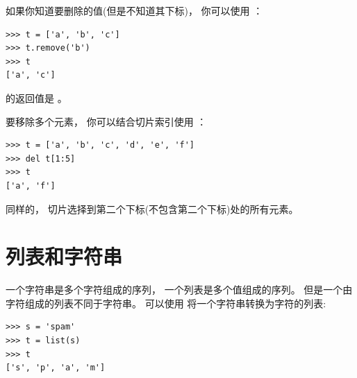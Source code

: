 %

如果你知道要删除的值(但是不知道其下标)， 你可以使用  ：

  

\begin{lstlisting}
>>> t = ['a', 'b', 'c']
>>> t.remove('b')
>>> t
['a', 'c']
\end{lstlisting}
%

 的返回值是 。

  


要移除多个元素， 你可以结合切片索引使用  ：

\begin{lstlisting}
>>> t = ['a', 'b', 'c', 'd', 'e', 'f']
>>> del t[1:5]
>>> t
['a', 'f']
\end{lstlisting}

%

同样的， 切片选择到第二个下标(不包含第二个下标)处的所有元素。


\section{列表和字符串}
  


一个字符串是多个字符组成的序列， 一个列表是多个值组成的序列。  但是一个由字符组成的列表不同于字符串。  可以使用  将一个字符串转换为字符的列表:

  

\begin{lstlisting}
>>> s = 'spam'
>>> t = list(s)
>>> t
['s', 'p', 'a', 'm']
\end{lstlisting}

